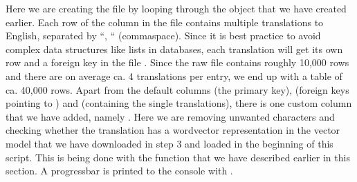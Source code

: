 \documentclass[letterpaper,10pt,english]{sphinxmanual}
\begin{document}
{{{{\begin{sphinxVerbatim}[commandchars=\\\{\}]
\end{sphinxVerbatim}

\sphinxAtStartPar
Here we are creating the file  by looping through the
 object that we have created earlier. Each row of the column
 in the file  contains multiple
translations to English, separated by “, “ (comma\sphinxhyphen{}space).
Since it is best practice to
avoid complex data structures like lists in databases, each translation
will get its own row and a foreign key in the file .
Since the raw file contains roughly 10,000 rows and there are on average ca. 4
translations per entry, we end up with a  table of ca.
40,000 rows.
Apart from the default columns  (the primary key), 
(foreign keys pointing to ) and 
(containing the single translations), there is one custom column that we
have added, namely . Here we are removing unwanted characters and
checking whether the translation has a word\sphinxhyphen{}vector representation in the
 vector model that we have
downloaded in step 3 and loaded in the beginning of this script. This is
being done with the  function that we have described
earlier in this section. A progressbar is printed to the console with
.

}}}}
\end{document}
